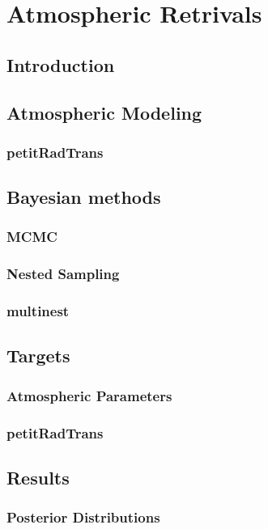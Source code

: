 \chapter{Atmospheric Retrivals}
\section{Introduction}
\section{Atmospheric Modeling}
\subsection{petitRadTrans}
\section{Bayesian methods}
\subsection{MCMC}
\subsection{Nested Sampling}
\subsection{multinest}
\section{Targets}
\subsection{Atmospheric Parameters}
\subsection{petitRadTrans}
\section{Results}
\subsection{Posterior Distributions}